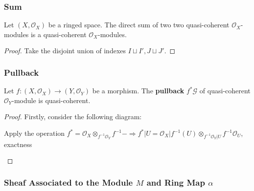 \documentclass[Total.tex]{subfiles}
\begin{document}
			\subsubsection{Sum}
			\begin{lemma}
				Let $(X,\mathcal{O}_X)$ be a ringed space. The direct sum of two two quasi-coherent $\mathcal{O}_X$-modules is a quasi-coherent $\mathcal{O}_X$-modules. 
			\end{lemma}
			\begin{proof}
				Take the disjoint union of indexes $I\sqcup I',J\sqcup J'$. 
			\end{proof}
			
			\subsubsection{Pullback}
			
			\begin{lemma}
				Let $f:(X,\mathcal{O}_X)\rightarrow (Y,\mathcal{O}_Y)$ be a morphism. The \textbf{pullback} $f^*\mathcal{G}$ of quasi-coherent $\mathcal{O}_Y$-module is quasi-coherent.
			\end{lemma}
			\begin{proof}
				Firstly, consider the following diagram:
				
				\begin{center}
				\end{center}
				
				Apply the operation $f^*=\mathcal{O}_X\otimes_{f^{-1}\mathcal{O}_Y} f^{-1}-\Rightarrow f^*|U=\mathcal{O}_X|f^{-1}(U)\otimes_{f^{-1}\mathcal{O}_Y|U} f^{-1}\mathcal{O}_U$, exactness
				
				\begin{center}
				\end{center}
			\end{proof}
			
			\subsubsection{Sheaf Associated to the Module $M$ and Ring Map $\alpha$}
			
\end{document}
